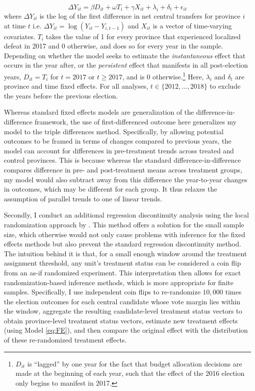 \documentclass[12pt]{article}
\newcommand\fnote[1]{\footnote{\baselineskip=2\normalbaselineskip#1}}
\newcommand{\1}{\mathbbm{1}}
\begin{document}
\begin{equation}
\Delta Y_{it} = \beta D_{it} + \omega T_{i} + \gamma X_{it} + \lambda_i + \delta_t + \epsilon_{it} \label{eq:FE}
\end{equation}
where $\Delta Y_{it}$ is the log of the first difference in net central transfers for province $i$ at time $t$ i.e. $\Delta Y_{it} = \log(Y_{it} - Y_{i, t-1})$ and $X_{it}$ is a vector of time-varying covariates. $T_{i}$ takes the value of 1 for every province that experienced localized defeat in 2017 and 0 otherwise, and does so for every year in the sample. Depending on whether the model seeks to estimate the \textit{instantaneous} effect that occurs in the year after, or the \textit{persistent} effect that manifests in all post-election years, $D_{it} = T_{i}$ for $t=2017$ or $t\geq2017$, and is  $0$ otherwise.\fnote{$D_{it}$ is ``lagged'' by one year for the fact that budget allocation decisions are made at the beginning of each year, such that the effect of the 2016 election only begins to manifest in 2017.} Here, $\lambda_i$ and $\delta_t$ are province and time fixed effects. For all analyses, $t \in \{2012, \ldots, 2018\}$ to exclude the years before the previous election.

Whereas standard fixed effects models are generalization of the difference-in-difference framework, the use of first-differenced outcome here generalizes my model to the triple differences method. Specifically, by allowing potential outcomes to be framed in terms of changes compared to previous years, the model can account for differences in pre-treatment trends across treated and control provinces. This is because whereas the standard difference-in-difference compares difference in pre- and post-treatment means across treatment groups, my model would also subtract away from this difference the year-to-year changes in outcomes, which may be different for each group. It thus relaxes the assumption of parallel trends to one of linear trends.

Secondly, I conduct an additional regression discontinuity analysis using the local randomization approach by \citet{CattaneoTitiunik2015}. This method offers a solution for the small sample size, which otherwise would not only cause problems with inference for the fixed effects methods but also prevent the standard regression discontinuity method. The intuition behind it is that, for a small enough window around the treatment assignment threshold, any unit's treatment status can be considered a coin flip from an as-if randomized experiment. This interpretation then allows for exact randomization-based inference methods, which is more appropriate for finite samples. Specifically, I use independent coin flips to re-randomize $10,000$ times the election outcomes for each central candidate whose vote margin lies within the window, aggregate the resulting candidate-level treatment status vectors to obtain province-level treatment status vectors, estimate new treatment effects (using Model \ref{eq:FE}), and then compare the original effect with the distribution of these re-randomized treatment effects.
\end{document}
